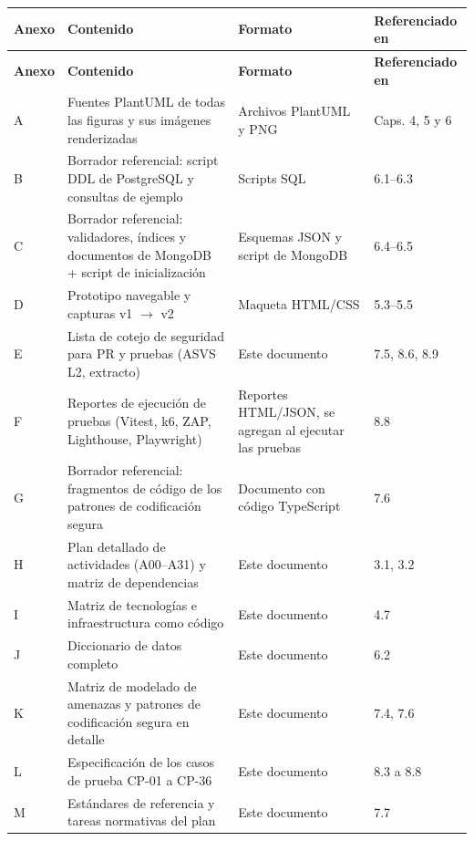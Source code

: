 \documentclass[11pt,a4paper]{article}
\begin{document}
\begingroup\small
\begin{longtable}{@{}>{\raggedright\arraybackslash\hspace{0pt}}p{}>{\raggedright\arraybackslash\hspace{0pt}}p{}>{\raggedright\arraybackslash\hspace{0pt}}p{}>{\raggedright\arraybackslash\hspace{0pt}}p{}@{}}
\toprule
\textbf{Anexo} & \textbf{Contenido} & \textbf{Formato} & \textbf{Referenciado en} \\ \midrule
\endfirsthead
\toprule
\textbf{Anexo} & \textbf{Contenido} & \textbf{Formato} & \textbf{Referenciado en} \\ \midrule
\endhead
\bottomrule
\endlastfoot
\mbox{A} & Fuentes PlantUML de todas las figuras y sus imágenes renderizadas & Archivos PlantUML y PNG & Caps. 4, 5 y 6 \\ \addlinespace[0.25em]
\mbox{B} & Borrador referencial: script DDL de PostgreSQL y consultas de ejemplo & Scripts SQL & \mbox{6.1--6.3} \\ \addlinespace[0.25em]
\mbox{C} & Borrador referencial: validadores, índices y documentos de MongoDB + script de inicialización & Esquemas JSON y script de MongoDB & \mbox{6.4--6.5} \\ \addlinespace[0.25em]
\mbox{D} & Prototipo navegable y capturas v1 \ensuremath{\rightarrow}\allowbreak{} v2 & Maqueta HTML/CSS & \mbox{5.3--5.5} \\ \addlinespace[0.25em]
\mbox{E} & Lista de cotejo de seguridad para PR y pruebas (ASVS L2, extracto) & Este documento & 7.5, 8.6, 8.9 \\ \addlinespace[0.25em]
\mbox{F} & Reportes de ejecución de pruebas (Vitest, k6, ZAP, Lighthouse, Playwright) & Reportes HTML/JSON, se agregan al ejecutar las pruebas & \mbox{8.8} \\ \addlinespace[0.25em]
\mbox{G} & Borrador referencial: fragmentos de código de los patrones de codificación segura & Documento con código TypeScript & \mbox{7.6} \\ \addlinespace[0.25em]
\mbox{H} & Plan detallado de actividades (A00--A31) y matriz de dependencias & Este documento & 3.1, 3.2 \\ \addlinespace[0.25em]
\mbox{I} & Matriz de tecnologías e infraestructura como código & Este documento & \mbox{4.7} \\ \addlinespace[0.25em]
\mbox{J} & Diccionario de datos completo & Este documento & \mbox{6.2} \\ \addlinespace[0.25em]
\mbox{K} & Matriz de modelado de amenazas y patrones de codificación segura en detalle & Este documento & 7.4, 7.6 \\ \addlinespace[0.25em]
\mbox{L} & Especificación de los casos de prueba \mbox{CP-01} a \mbox{CP-36} & Este documento & 8.3 a 8.8 \\ \addlinespace[0.25em]
\mbox{M} & Estándares de referencia y tareas normativas del plan & Este documento & \mbox{7.7} \\
\end{longtable}
\endgroup
\end{document}
